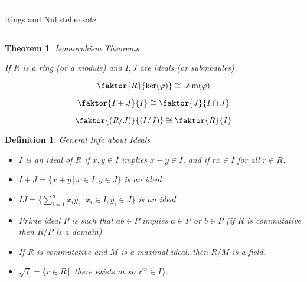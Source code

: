 \documentclass[12pt]{Qual}
\newtheorem{theorem}{Theorem}
\newtheorem{definition}{Definition}
\begin{document}
\begin{center}
\noindent\textcolor{blue!60!black}{\rule{15cm}{1mm}}
\Huge \faBug\faPuzzlePiece\faCoffee Rings and Nullstellensatz \faCoffee\faPuzzlePiece\faBug
\vspace{-0.5cm}
\noindent\textcolor{blue!60!black}{\rule{15cm}{1mm}}
\end{center}
\vspace{0.5cm}
\begin{theorem}{\Large\textit{Isomorphism Theorems}}

If $R$ is a ring (or a module) and $I,J$ are ideals (or submodules)

\begin{minipage}{0.3\textwidth}
$$\faktor{R}{\ker(\varphi)}\cong\im(\varphi)$$
\end{minipage}\hspace{0.25cm}\begin{minipage}{0.3\textwidth}
$$\faktor{I+J}{I}\cong \faktor{J}{I\cap J}$$
\end{minipage}\hspace{0.35cm}\begin{minipage}{0.3\textwidth}
$$\faktor{(R/J)}{(I/J)}\cong \faktor{R}{I}$$
\end{minipage}

\end{theorem}
\vspace{0.5cm}
\begin{definition}{\Large\textit{General Info about Ideals}}
$\,$

\begin{itemize}
\renewcommand\labelitemi{\faCoffee}
    \item $I$ is an ideal of $R$ if $x,y\in I$ implies $x-y\in I$, and if $rx\in I$ for all $r\in R$.
    \item $I+J=\{x+y\,|\,x\in I,y\in J\}$ is an ideal
    \item $IJ=\{\sum_{i=1}^nx_iy_i\,|\,x_i\in I,y_i\in J\}$ is an ideal
    \item Prime ideal $P$ is such that $ab\in P$ implies $a\in P$ or $b\in P$ (if $R$ is commutative then $R/P$ is a domain)
    \item If $R$ is commutative and $M$ is a maximal ideal, then $R/M$ is a field.
    \item $\sqrt{I}=\{r\in R\,|\, $ there exists $m$ so $r^m\in I\}$.
\end{itemize}

\end{definition}
\end{document}
